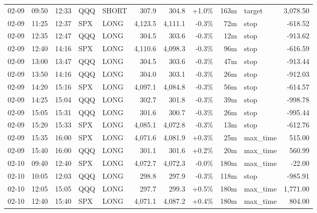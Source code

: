 \documentclass[11pt,a4paper,twoside]{article}
\begin{document}
\begin{center}
\begin{longtable}{>{\color{txtmain}}l l l l l r r r r >{\color{txtmain}}l r}
02-09 & 09:50 & 12:33 & QQQ & SHORT & 307.9 & 304.8 & \textcolor{wingreen}{+1.0\%} & 163m & target & \textcolor{wingreen}{3,078.50} \\
02-09 & 11:25 & 12:37 & SPX & LONG & 4,123.5 & 4,111.1 & \textcolor{lossred}{-0.3\%} & 72m & stop & \textcolor{lossred}{-618.52} \\
02-09 & 12:35 & 12:47 & QQQ & LONG & 304.5 & 303.6 & \textcolor{lossred}{-0.3\%} & 12m & stop & \textcolor{lossred}{-913.62} \\
02-09 & 12:40 & 14:16 & SPX & LONG & 4,110.6 & 4,098.3 & \textcolor{lossred}{-0.3\%} & 96m & stop & \textcolor{lossred}{-616.59} \\
02-09 & 13:00 & 13:47 & QQQ & LONG & 304.5 & 303.6 & \textcolor{lossred}{-0.3\%} & 47m & stop & \textcolor{lossred}{-913.44} \\
02-09 & 13:50 & 14:16 & QQQ & LONG & 304.0 & 303.1 & \textcolor{lossred}{-0.3\%} & 26m & stop & \textcolor{lossred}{-912.03} \\
02-09 & 14:20 & 15:16 & SPX & LONG & 4,097.1 & 4,084.8 & \textcolor{lossred}{-0.3\%} & 56m & stop & \textcolor{lossred}{-614.57} \\
02-09 & 14:25 & 15:04 & QQQ & LONG & 302.7 & 301.8 & \textcolor{lossred}{-0.3\%} & 39m & stop & \textcolor{lossred}{-998.78} \\
02-09 & 15:05 & 15:31 & QQQ & LONG & 301.6 & 300.7 & \textcolor{lossred}{-0.3\%} & 26m & stop & \textcolor{lossred}{-995.44} \\
02-09 & 15:20 & 15:33 & SPX & LONG & 4,085.1 & 4,072.8 & \textcolor{lossred}{-0.3\%} & 13m & stop & \textcolor{lossred}{-612.76} \\
02-09 & 15:35 & 16:00 & SPX & LONG & 4,071.6 & 4,081.9 & \textcolor{wingreen}{+0.3\%} & 25m & max\_time & \textcolor{wingreen}{515.00} \\
02-09 & 15:40 & 16:00 & QQQ & LONG & 301.1 & 301.6 & \textcolor{wingreen}{+0.2\%} & 20m & max\_time & \textcolor{wingreen}{560.99} \\
02-10 & 09:40 & 12:40 & SPX & LONG & 4,072.7 & 4,072.3 & \textcolor{lossred}{-0.0\%} & 180m & max\_time & \textcolor{lossred}{-22.00} \\
02-10 & 10:05 & 12:03 & QQQ & LONG & 298.8 & 297.9 & \textcolor{lossred}{-0.3\%} & 118m & stop & \textcolor{lossred}{-985.91} \\
02-10 & 12:05 & 15:05 & QQQ & LONG & 297.7 & 299.3 & \textcolor{wingreen}{+0.5\%} & 180m & max\_time & \textcolor{wingreen}{1,771.00} \\
02-10 & 12:40 & 15:40 & SPX & LONG & 4,071.1 & 4,087.2 & \textcolor{wingreen}{+0.4\%} & 180m & max\_time & \textcolor{wingreen}{804.00} \\

\end{longtable}
\end{center}
\end{document}
